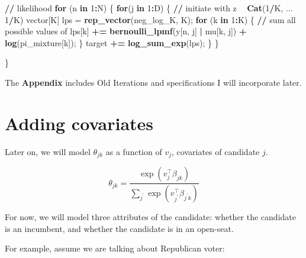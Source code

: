 \documentclass[12pt,letterpaper]{article}
\numberwithin{equation}{section}
\newenvironment{Shaded}{\begin{snugshade}}{\end{snugshade}}
\newcommand{\ControlFlowTok}[1]{\textcolor[rgb]{0.13,0.29,0.53}{\textbf{#1}}}
\newcommand{\DecValTok}[1]{\textcolor[rgb]{0.00,0.00,0.81}{#1}}
\newcommand{\ErrorTok}[1]{\textcolor[rgb]{0.64,0.00,0.00}{\textbf{#1}}}
\newcommand{\KeywordTok}[1]{\textcolor[rgb]{0.13,0.29,0.53}{\textbf{#1}}}
\newcommand{\NormalTok}[1]{#1}
\newcommand{\OperatorTok}[1]{\textcolor[rgb]{0.81,0.36,0.00}{\textbf{#1}}}
\newcommand{\StringTok}[1]{\textcolor[rgb]{0.31,0.60,0.02}{#1}}
\begin{document}
\begin{Shaded}
\begin{Highlighting}[]
  \OperatorTok{/}\ErrorTok{/}\StringTok{ }\NormalTok{likelihood}
  \ControlFlowTok{for}\NormalTok{ (n }\ControlFlowTok{in} \DecValTok{1}\OperatorTok{:}\NormalTok{N) \{}
    \ControlFlowTok{for}\NormalTok{(j }\ControlFlowTok{in} \DecValTok{1}\OperatorTok{:}\NormalTok{D) \{}
      \OperatorTok{/}\ErrorTok{/}\StringTok{ }\NormalTok{initiate with z }\OperatorTok{~}\StringTok{ }\KeywordTok{Cat}\NormalTok{(}\DecValTok{1}\OperatorTok{/}\NormalTok{K, ... }\DecValTok{1}\OperatorTok{/}\NormalTok{K)}
\NormalTok{      vector[K] lps =}\StringTok{ }\KeywordTok{rep_vector}\NormalTok{(neg_log_K, K);}
      \ControlFlowTok{for}\NormalTok{ (k }\ControlFlowTok{in} \DecValTok{1}\OperatorTok{:}\NormalTok{K) \{}
        \OperatorTok{/}\ErrorTok{/}\StringTok{ }\NormalTok{sum all possible values of}
\NormalTok{        lps[k] }\OperatorTok{+}\ErrorTok{=}\StringTok{ }\KeywordTok{bernoulli_lpmf}\NormalTok{(y[n, j] }\OperatorTok{|}\StringTok{ }\NormalTok{mu[k, j]) }\OperatorTok{+}\StringTok{ }\KeywordTok{log}\NormalTok{(pi_mixture[k]);}
\NormalTok{      \}}
\NormalTok{      target }\OperatorTok{+}\ErrorTok{=}\StringTok{ }\KeywordTok{log_sum_exp}\NormalTok{(lps);}
\NormalTok{    \}}
\NormalTok{  \}}



\NormalTok{\}}
\end{Highlighting}
\end{Shaded}

\pagebreak

\appendix

The \textbf{Appendix} includes Old Iterations and specifications I will
incorporate later.

\section{Adding covariates}

Later on, we will model \(\theta_{jk}\) as a function of \(v_{j}\),
covariates of candidate \(j\).

\[\theta_{jk} = \frac{\exp(v_{j}^{\top}\beta_{jk})}{\sum_{j^{\prime}} \exp(v_{j^{\prime}}^{\top}\beta_{j^{\prime}k})} \]

For now, we will model three attributes of the candidate: whether the
candidate is an incumbent, and whether the candidate is in an open-seat.

For example, assume we are talking about Republican voter:
\end{document}

